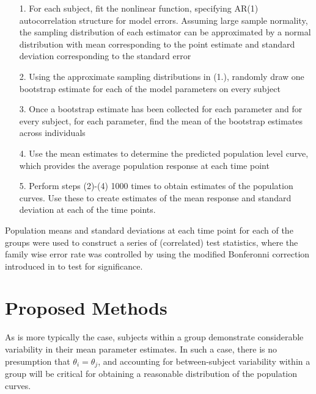 \documentclass{article}
\begin{document}
\begin{enumerate}
\vspace{-3mm}
\item[1.] For each subject, fit the nonlinear function, specifying AR(1) autocorrelation structure for model errors. Assuming large sample normality, the sampling distribution of each estimator can be approximated by a normal distribution with mean corresponding to the point estimate and standard deviation corresponding to the standard error

\item[2.] Using the approximate sampling distributions in (1.), randomly draw one bootstrap estimate for each of the model parameters on every subject

\item[3.] Once a bootstrap estimate has been collected for each parameter and for every subject, for each parameter, find the mean of the bootstrap estimates across individuals

\item[4.] Use the mean estimates to determine the predicted population level curve, which provides the average population response at each time point

\item[5.] Perform steps (2)-(4) 1000 times to obtain estimates of the population curves. Use these to create estimates of the mean response and standard deviation at each of the time points. 
\end{enumerate}

Population means and standard deviations at each time point for each of the groups were used to construct a series of (correlated) test statistics, where the family wise error rate was controlled by using the modified Bonferonni correction introduced in \cite{oleson2017detecting} to test for significance.


\section{Proposed Methods}

As is more typically the case, subjects within a group demonstrate considerable variability in their mean parameter estimates. In such a case, there is no presumption that $\theta_i = \theta_j$, and accounting for between-subject variability within a group will be critical for obtaining a reasonable distribution of the population curves.
\end{document}
